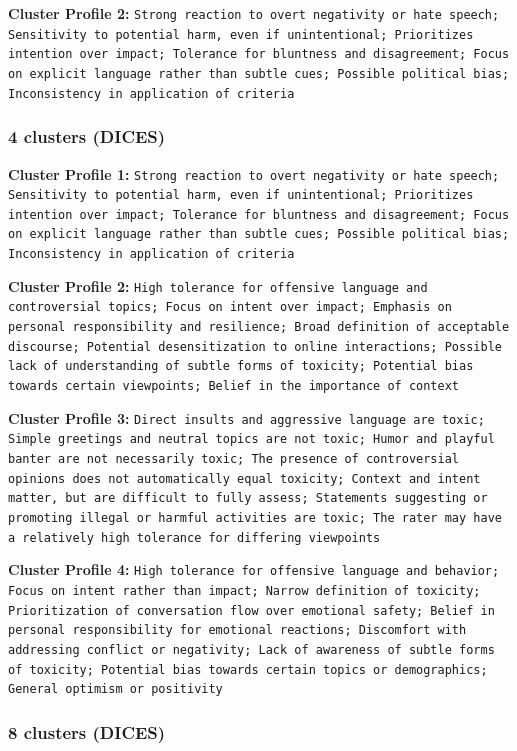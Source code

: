 \documentclass[11pt]{article}
\begin{document}
\textbf{Cluster Profile 2:} \texttt{Strong reaction to overt negativity or hate speech; Sensitivity to potential harm, even if unintentional; Prioritizes intention over impact; Tolerance for bluntness and disagreement; Focus on explicit language rather than subtle cues; Possible political bias; Inconsistency in application of criteria}


\subsubsection{4 clusters (DICES)}


\textbf{Cluster Profile 1:} \texttt{Strong reaction to overt negativity or hate speech; Sensitivity to potential harm, even if unintentional; Prioritizes intention over impact; Tolerance for bluntness and disagreement; Focus on explicit language rather than subtle cues; Possible political bias; Inconsistency in application of criteria}


\textbf{Cluster Profile 2:} \texttt{High tolerance for offensive language and controversial topics; Focus on intent over impact; Emphasis on personal responsibility and resilience; Broad definition of acceptable discourse; Potential desensitization to online interactions; Possible lack of understanding of subtle forms of toxicity; Potential bias towards certain viewpoints; Belief in the importance of context}


\textbf{Cluster Profile 3:} \texttt{Direct insults and aggressive language are toxic; Simple greetings and neutral topics are not toxic; Humor and playful banter are not necessarily toxic; The presence of controversial opinions does not automatically equal toxicity; Context and intent matter, but are difficult to fully assess; Statements suggesting or promoting illegal or harmful activities are toxic; The rater may have a relatively high tolerance for differing viewpoints}


\textbf{Cluster Profile 4:} \texttt{High tolerance for offensive language and behavior; Focus on intent rather than impact; Narrow definition of toxicity; Prioritization of conversation flow over emotional safety; Belief in personal responsibility for emotional reactions; Discomfort with addressing conflict or negativity; Lack of awareness of subtle forms of toxicity; Potential bias towards certain topics or demographics; General optimism or positivity}


\subsubsection{8 clusters (DICES)}
\end{document}
